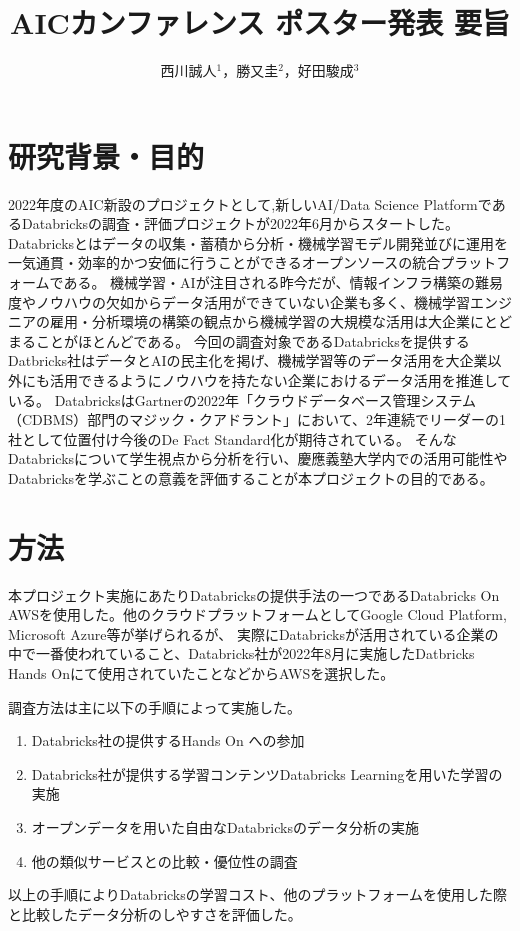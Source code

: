 \documentclass[twocolumn]{jsarticle}
\title{AICカンファレンス ポスター発表 要旨}
\author{西川誠人$^1$，勝又圭$^2$，好田駿成$^3$}
\begin{document}
\maketitle
\section{研究背景・目的}
2022年度のAIC新設のプロジェクトとして,新しいAI/Data Science PlatformであるDatabricksの調査・評価プロジェクトが2022年6月からスタートした。
Databricksとはデータの収集・蓄積から分析・機械学習モデル開発並びに運用を一気通貫・効率的かつ安価に行うことができるオープンソースの統合プラットフォーム\cite{databricksHP}である。
機械学習・AIが注目される昨今だが、情報インフラ構築の難易度やノウハウの欠如からデータ活用ができていない企業も多く、機械学習エンジニアの雇用・分析環境の構築の観点から機械学習の大規模な活用は大企業にとどまることがほとんどである。
今回の調査対象であるDatabricksを提供するDatbricks社はデータとAIの民主化を掲げ、機械学習等のデータ活用を大企業以外にも活用できるようにノウハウを持たない企業におけるデータ活用を推進している。
DatabricksはGartnerの2022年「クラウドデータベース管理システム（CDBMS）部門のマジック・クアドラント」において、2年連続でリーダーの1社\cite{Gartner}として位置付け今後のDe Fact Standard化が期待されている。
そんなDatabricksについて学生視点から分析を行い、慶應義塾大学内での活用可能性やDatabricksを学ぶことの意義を評価することが本プロジェクトの目的である。
\section{方法}
本プロジェクト実施にあたりDatabricksの提供手法の一つであるDatabricks On AWSを使用した。他のクラウドプラットフォームとしてGoogle Cloud Platform, Microsoft Azure等が挙げられるが、
実際にDatabricksが活用されている企業の中で一番使われていること、Databricks社が2022年8月に実施したDatbricks Hands Onにて使用されていたことなどからAWSを選択した。\par 
調査方法は主に以下の手順によって実施した。
\begin{enumerate}
  \item Databricks社の提供するHands On への参加
  \item Databricks社が提供する学習コンテンツDatabricks Learningを用いた学習の実施
  \item オープンデータを用いた自由なDatabricksのデータ分析の実施
  \item 他の類似サービスとの比較・優位性の調査
\end{enumerate}
以上の手順によりDatabricksの学習コスト、他のプラットフォームを使用した際と比較したデータ分析のしやすさを評価した。
\end{document}
